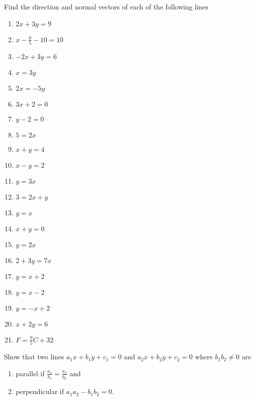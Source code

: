 Find the direction and normal vectors of each of the following lines
\begin{enumerate}[label=\thesubsection.\arabic*,ref=\thesubsection.\theenumi]
\item $2x+3y=9$
\item $x-\frac{y}{5}-10=10$
\item $-2x+3y=6$
\item $ x=3y$
\item $2x=-5y$
\item $3x+2=0$
\item $y-2=0$
\item $5=2x$
\item $x+y=4$
\item $x-y=2$
\item $y=3x$
\item $3=2x+y$
\item $y=x$
\item $x+y=0$
\item $y=2x$
\item $2+3y=7x$
\item $y=x+2$
\item $y=x-2$
\item $y=-x+2$
\item $x+2y=6$
\item $F=\frac{9}{5}C+32$
\end{enumerate}
Show that two lines $a_1x+b_1y+c_1=0$ and $a_2x+b_2y+c_2=0$ where $b_1b_2\neq 0$ are
\begin{enumerate}[label=\thesubsection.\arabic*,ref=\thesubsection.\theenumi,resume*]
\item parallel if $\frac{a_1}{b_1}=\frac{a_2}{b_2}$ and 
\item perpendicular if $a_1a_2-b_1b_2=0$.
\end{enumerate}
